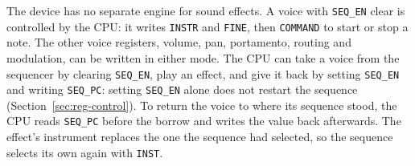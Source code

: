 The device has no separate engine for sound effects. A voice with \texttt{SEQ\_EN} clear is controlled by the CPU: it
writes \texttt{INSTR} and \texttt{FINE}, then \texttt{COMMAND} to start or stop a note. The other voice registers,
volume, pan, portamento, routing and modulation, can be written in either mode. The CPU can take a voice from the
sequencer by clearing \texttt{SEQ\_EN}, play an effect, and give it back by setting \texttt{SEQ\_EN} and writing
\texttt{SEQ\_PC}: setting \texttt{SEQ\_EN} alone does not restart the sequence (Section~\ref{sec:reg-control}). To
return the voice to where its sequence stood, the CPU reads \texttt{SEQ\_PC} before the borrow and writes the value
back afterwards. The effect's instrument replaces the one the sequence had selected, so the sequence selects its own
again with \texttt{INST}.
